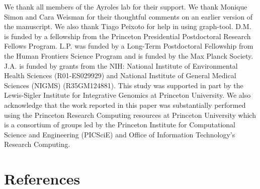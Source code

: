 \documentclass[
]{article}
\begin{document}
We thank all members of the Ayroles lab for their support. We thank
Monique Simon and Cara Weisman for their thoughtful comments on an
earlier version of the manuscript. We also thank Tiago Peixoto for help
in using graph-tool. D.M. is funded by a fellowship from the Princeton
Presidential Postdoctoral Research Fellows Program. L.P. was funded by a
Long-Term Postdoctoral Fellowship from the Human Frontiers Science
Program and is funded by the Max Planck Society. J.A. is funded by
grants from the NIH: National Institute of Environmental Health Sciences
(R01-ES029929) and National Institute of General Medical Sciences
(NIGMS) (R35GM124881). This study was supported in part by the
Lewis-Sigler Institute for Integrative Genomics at Princeton University.
We also acknowledge that the work reported in this paper was
substantially performed using the Princeton Research Computing resources
at Princeton University which is a consortium of groups led by the
Princeton Institute for Computational Science and Engineering (PICSciE)
and Office of Information Technology's Research Computing.

\section*{References}\label{references}
\end{document}
